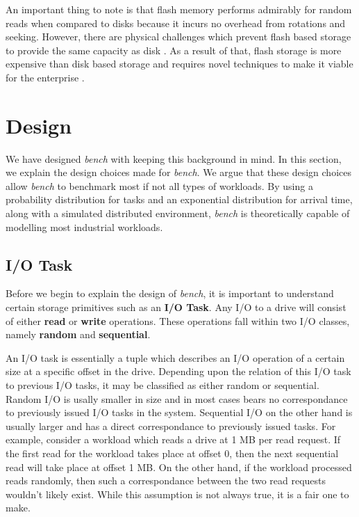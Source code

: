 \documentclass[10pt, author, twocolumn]{article}
\begin{document}
An important thing to note is that flash memory performs admirably for random reads when compared to disks because it incurs no overhead from rotations and seeking. However, there are physical challenges which prevent flash based storage to provide the same capacity as disk \cite{micheloni2010nand}. As a result of that, flash storage is more expensive than disk based storage and requires novel techniques to make it viable for the enterprise \cite{colgrove2015purity}. 

\section{Design}
We have designed \textit{bench} with keeping this background in mind. In this section, we explain the design choices made for \textit{bench}. We argue that these design choices allow \textit{bench} to benchmark most if not all types of workloads. By using a probability distribution for tasks and an exponential distribution for arrival time, along with a simulated distributed environment, \textit{bench} is theoretically capable of modelling most industrial workloads. 

\subsection{I/O Task}
Before we begin to explain the design of \textit{bench}, it is important to understand certain storage primitives such as an \textbf{I/O Task}. Any I/O to a drive will consist of either \textbf{read} or \textbf{write} operations. These operations fall within two I/O classes, namely \textbf{random} and \textbf{sequential}. 

An I/O task is essentially a tuple which describes an I/O operation of a certain size at a specific offset in the drive. Depending upon the relation of this I/O task to previous I/O tasks, it may be classified as either random or sequential. Random I/O is usally smaller in size and in most cases bears no correspondance to previously issued I/O tasks in the system. Sequential I/O on the other hand is usually larger and has a direct correspondance to previously issued tasks. For example, consider a workload which reads a drive at 1 MB per read request. If the first read for the workload takes place at offset 0, then the next sequential read will take place at offset 1 MB. On the other hand, if the workload processed reads randomly, then such a correspondance between the two read requests wouldn't likely exist. While this assumption is not always true, it is a fair one to make.
\end{document}
